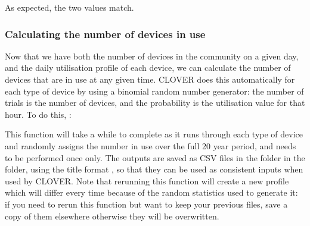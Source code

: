 \documentclass[letterpaper,10pt,english]{sphinxmanual}
\begin{document}
\begin{sphinxVerbatim}[commandchars=\\\{\}]
    
    
      
     
\end{sphinxVerbatim}

\sphinxAtStartPar
As expected, the two values match.


\subsubsection{Calculating the number of devices in use}
\label{\detokenize{load:calculating-the-number-of-devices-in-use}}
\sphinxAtStartPar
Now that we have both the number of devices in the community on a given
day, and the daily utilisation profile of each device, we can calculate
the number of devices that are in use at any given time. CLOVER does
this automatically for each type of device by using a binomial random
number generator: the number of trials is the number of devices, and the
probability is the utilisation value for that hour. To do this, :

\begin{sphinxVerbatim}[commandchars=\\\{\}]
\end{sphinxVerbatim}

\sphinxAtStartPar
This function will take a while to complete as it runs through each type
of device and randomly assigns the number in use over the full 20 year
period, and needs to be performed once only. The outputs are saved as
CSV files in the  folder in the  folder, using the
title format , so that they can be used as
consistent inputs when used by CLOVER. Note that rerunning this function
will create a new profile which will differ every time because of the
random statistics used to generate it: if you need to rerun this
function but want to keep your previous files, save a copy of them
elsewhere otherwise they will be overwritten.
\end{document}
